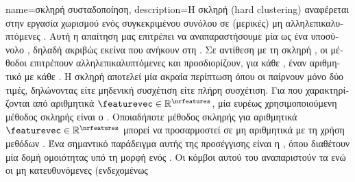 {name={\foreignlanguage{greek}{σκληρή συσταδοποίηση}}, 
	description={\foreignlanguage{greek}{Η σκληρή}  
		(hard clustering) \foreignlanguage{greek}{αναφέρεται στην εργασία χωρισμού ενός συγκεκριμένου συνόλου}  
		\foreignlanguage{greek}{σε (μερικές) μη αλληλεπικαλυπτόμενες} . 
		\foreignlanguage{greek}{Αυτή η α\-παί\-τηση μας επιτρέπει να αναπαραστήσουμε μία}  \foreignlanguage{greek}{ως 
		ένα υποσύνολο} , \foreignlanguage{greek}{δηλαδή ακριβώς εκείνα που ανήκουν στη} . 
		\foreignlanguage{greek}{Σε αντίθεση με τη σκληρή} , \foreignlanguage{greek}{οι μέθοδοι}  
		\foreignlanguage{greek}{επιτρέπουν αλληλεπικαλυπτόμενες}  \foreignlanguage{greek}{και προσδιορίζουν, για κάθε}
		, \foreignlanguage{greek}{έναν αριθμητικό}  \foreignlanguage{greek}{με κάθε} . 
		\foreignlanguage{greek}{Η σκληρή}  \foreignlanguage{greek}{αποτελεί μία ακραία περίπτωση}  
		\foreignlanguage{greek}{όπου οι}  \foreignlanguage{greek}{παίρνουν μόνο δύο τιμές, δηλώνοντας είτε μηδενική 
		συσχέτιση είτε πλήρη συσχέτιση. Για}  \foreignlanguage{greek}{που χαρακτηρίζονται από αριθμητικά}  
		 $\featurevec \in \mathbb{R}^{\nrfeatures}$, \foreignlanguage{greek}{μία ευρέως χρησιμοποιούμενη μέθοδος σκληρής} 
		 \foreignlanguage{greek}{είναι ο} . \foreignlanguage{greek}{Οποιαδήποτε μέθοδος σκληρής} 
		 \foreignlanguage{greek}{για αριθμητικά}  $\featurevec \in \mathbb{R}^{\nrfeatures}$ 
		\foreignlanguage{greek}{μπορεί να προσαρμοστεί σε μη αριθμητικά}  \foreignlanguage{greek}{με τη χρήση 
		μεθόδων} . \foreignlanguage{greek}{Ένα σημαντικό παράδειγμα αυτής της προσέγγισης είναι η} 
		, \foreignlanguage{greek}{όπου}  \foreignlanguage{greek}{διαθέτουν μία δομή 
		ομοιότητας υπό τη μορφή ενός} . \foreignlanguage{greek}{Οι κόμβοι αυτού του}  
		\foreignlanguage{greek}{αναπαριστούν τα}  \foreignlanguage{greek}{ενώ οι μη κατευθυνόμενες (ενδεχομένως 
}}}
